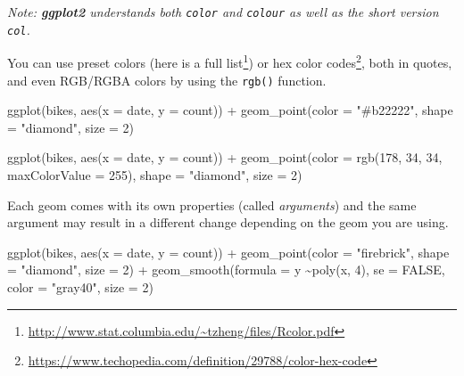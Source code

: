 \documentclass[
]{krantz}
\makeatletter
\newenvironment{Shaded}{\begin{snugshade}}{\end{snugshade}}
\newcommand{\AttributeTok}[1]{\textcolor[rgb]{0.61,0.61,0.61}{#1}}
\newcommand{\ConstantTok}[1]{\textcolor[rgb]{0,0,0}{#1}}
\newcommand{\DecValTok}[1]{\textcolor[rgb]{0.06,0.06,0.06}{#1}}
\newcommand{\FunctionTok}[1]{\textcolor[rgb]{0,0,0}{#1}}
\newcommand{\NormalTok}[1]{#1}
\newcommand{\SpecialCharTok}[1]{\textcolor[rgb]{0,0,0}{#1}}
\newcommand{\StringTok}[1]{\textcolor[rgb]{0.5,0.5,0.5}{#1}}
\renewcommand{\href}[2]{#2\footnote{\url{#1}}}
\newenvironment{kframe}{%
\medskip{}
\setlength{\fboxsep}{.8em}
 \def\at@end@of@kframe{}%
 \ifinner\ifhmode%
  \def\at@end@of@kframe{\end{minipage}}%
  \begin{minipage}{\columnwidth}%
 \fi\fi%
 \def\FrameCommand##1{\hskip\@totalleftmargin \hskip-\fboxsep
 \colorbox{shadecolor}{##1}\hskip-\fboxsep
     \hskip-\linewidth \hskip-\@totalleftmargin \hskip\columnwidth}%
 \MakeFramed {\advance\hsize-\width
   \@totalleftmargin\z@ \linewidth\hsize
   \@setminipage}}%
 {\par\unskip\endMakeFramed%
 \at@end@of@kframe}
\renewenvironment{Shaded}{\begin{kframe}}{\end{kframe}}
\makeatother
\begin{document}
\emph{Note: \textbf{ggplot2} understands both \texttt{color} and \texttt{colour} as well as the short version \texttt{col}.}

You can use preset colors (here is a \href{http://www.stat.columbia.edu/~tzheng/files/Rcolor.pdf}{full list}) or \href{https://www.techopedia.com/definition/29788/color-hex-code}{hex color codes}, both in quotes, and even RGB/RGBA colors by using the \texttt{rgb()} function.

\begin{Shaded}
\begin{Highlighting}[]
\FunctionTok{ggplot}\NormalTok{(bikes, }\FunctionTok{aes}\NormalTok{(}\AttributeTok{x =}\NormalTok{ date, }\AttributeTok{y =}\NormalTok{ count)) }\SpecialCharTok{+} 
  \FunctionTok{geom\_point}\NormalTok{(}\AttributeTok{color =} \StringTok{"\#b22222"}\NormalTok{, }\AttributeTok{shape =} \StringTok{"diamond"}\NormalTok{, }\AttributeTok{size =} \DecValTok{2}\NormalTok{)}

\FunctionTok{ggplot}\NormalTok{(bikes, }\FunctionTok{aes}\NormalTok{(}\AttributeTok{x =}\NormalTok{ date, }\AttributeTok{y =}\NormalTok{ count)) }\SpecialCharTok{+} 
  \FunctionTok{geom\_point}\NormalTok{(}\AttributeTok{color =} \FunctionTok{rgb}\NormalTok{(}\DecValTok{178}\NormalTok{, }\DecValTok{34}\NormalTok{, }\DecValTok{34}\NormalTok{, }\AttributeTok{maxColorValue =} \DecValTok{255}\NormalTok{), }\AttributeTok{shape =} \StringTok{"diamond"}\NormalTok{, }\AttributeTok{size =} \DecValTok{2}\NormalTok{)}
\end{Highlighting}
\end{Shaded}

Each geom comes with its own properties (called \emph{arguments}) and the same argument may result in a different change depending on the geom you are using.

\begin{Shaded}
\begin{Highlighting}[]
\FunctionTok{ggplot}\NormalTok{(bikes, }\FunctionTok{aes}\NormalTok{(}\AttributeTok{x =}\NormalTok{ date, }\AttributeTok{y =}\NormalTok{ count)) }\SpecialCharTok{+} 
    \FunctionTok{geom\_point}\NormalTok{(}\AttributeTok{color =} \StringTok{"firebrick"}\NormalTok{, }\AttributeTok{shape =} \StringTok{"diamond"}\NormalTok{, }\AttributeTok{size =} \DecValTok{2}\NormalTok{) }\SpecialCharTok{+} 
    \FunctionTok{geom\_smooth}\NormalTok{(}\AttributeTok{formula =}\NormalTok{ y  }\SpecialCharTok{\textasciitilde{}}\FunctionTok{poly}\NormalTok{(x, }\DecValTok{4}\NormalTok{), }\AttributeTok{se =} \ConstantTok{FALSE}\NormalTok{, }
                \AttributeTok{color =} \StringTok{"gray40"}\NormalTok{, }\AttributeTok{size =} \DecValTok{2}\NormalTok{)}
\end{Highlighting}
\end{Shaded}
\end{document}
